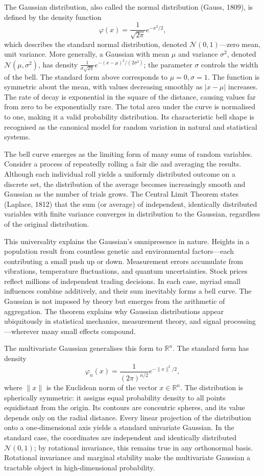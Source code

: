 The Gaussian distribution, also called the normal distribution (Gauss, 1809), is defined by the density function
\[
\varphi(x) = \frac{1}{\sqrt{2\pi}} e^{-x^2/2},
\]
which describes the standard normal distribution, denoted \( \mathcal{N}(0,1) \)—zero mean, unit variance. More generally, a Gaussian with mean \( \mu \) and variance \( \sigma^2 \), denoted \( \mathcal{N}(\mu, \sigma^2) \), has density \( \frac{1}{\sigma\sqrt{2\pi}} e^{-(x-\mu)^2/(2\sigma^2)} \); the parameter \( \sigma \) controls the width of the bell. The standard form above corresponds to \( \mu = 0, \sigma = 1 \). The function is symmetric about the mean, with values decreasing smoothly as \( |x - \mu| \) increases. The rate of decay is exponential in the square of the distance, causing values far from zero to be exponentially rare. The total area under the curve is normalised to one, making it a valid probability distribution. Its characteristic bell shape is recognised as the canonical model for random variation in natural and statistical systems.

The bell curve emerges as the limiting form of many sums of random variables. Consider a process of repeatedly rolling a fair die and averaging the results. Although each individual roll yields a uniformly distributed outcome on a discrete set, the distribution of the average becomes increasingly smooth and Gaussian as the number of trials grows. The Central Limit Theorem states (Laplace, 1812) that the sum (or average) of independent, identically distributed variables with finite variance converges in distribution to the Gaussian, regardless of the original distribution. 

This universality explains the Gaussian's omnipresence in nature. Heights in a population result from countless genetic and environmental factors—each contributing a small push up or down. Measurement errors accumulate from vibrations, temperature fluctuations, and quantum uncertainties. Stock prices reflect millions of independent trading decisions. In each case, myriad small influences combine additively, and their sum inevitably forms a bell curve. The Gaussian is not imposed by theory but emerges from the arithmetic of aggregation. The theorem explains why Gaussian distributions appear ubiquitously in statistical mechanics, measurement theory, and signal processing—wherever many small effects compound.

The multivariate Gaussian generalises this form to \( \mathbb{R}^n \). The standard form has density
\[
\varphi_n(x) = \frac{1}{(2\pi)^{n/2}} e^{-\|x\|^2/2},
\]
where \( \|x\| \) is the Euclidean norm of the vector \( x \in \mathbb{R}^n \). The distribution is spherically symmetric: it assigns equal probability density to all points equidistant from the origin. Its contours are concentric spheres, and its value depends only on the radial distance. Every linear projection of the distribution onto a one-dimensional axis yields a standard univariate Gaussian. In the standard case, the coordinates are independent and identically distributed \(\mathcal{N}(0,1)\); by rotational invariance, this remains true in any orthonormal basis. Rotational invariance and marginal stability make the multivariate Gaussian a tractable object in high-dimensional probability.

